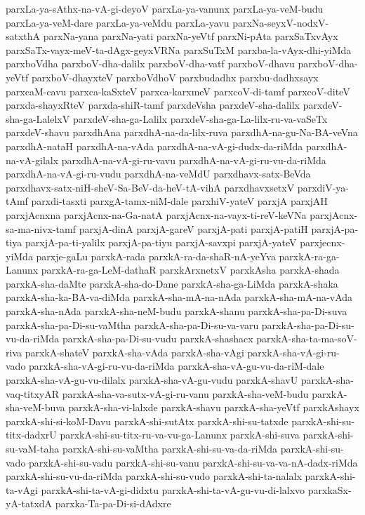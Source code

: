{parxLa-ya-sAthx-na-vA-gi-deyoV
parxLa-ya-vanunx
parxLa-ya-veM-budu
parxLa-ya-veM-dare
parxLa-ya-veMdu
parxLa-yavu
parxNa-seyxV-nodxV-satxthA
parxNa-yana
parxNa-yati
parxNa-yeVtf
parxNi-pAta
parxSaTxvAyx
parxSaTx-vayx-meV-ta-dAgx-geyxVRNa
parxSuTxM
parxba-la-vAyx-dhi-yiMda
parxboVdha
parxboV-dha-dalilx
parxboV-dha-vatf
parxboV-dhavu
parxboV-dha-yeVtf
parxboV-dhayxteV
parxboVdhoV
parxbudadhx
parxbu-dadhxsayx
parxcaM-cavu
parxca-kaSxteV
parxca-karxmeV
parxcoV-di-tamf
parxcoV-diteV
parxda-shayxRteV
parxda-shiR-tamf
parxdeVsha
parxdeV-sha-dalilx
parxdeV-sha-ga-LalelxV
parxdeV-sha-ga-Lalilx
parxdeV-sha-ga-La-lilx-ru-va-vaSeTx
parxdeV-shavu
parxdhAna
parxdhA-na-da-lilx-ruva
parxdhA-na-gu-Na-BA-veVna
parxdhA-nataH
parxdhA-na-vAda
parxdhA-na-vA-gi-dudx-da-riMda
parxdhA-na-vA-gilalx
parxdhA-na-vA-gi-ru-vavu
parxdhA-na-vA-gi-ru-vu-da-riMda
parxdhA-na-vA-gi-ru-vudu
parxdhA-na-veMdU
parxdhavx-satx-BeVda
parxdhavx-satx-niH-sheV-Sa-BeV-da-heV-tA-vihA
parxdhavxsetxV
parxdiV-ya-tAmf
parxdi-tasxti
parxgA-tamx-niM-dale
parxhiV-yateV
parxjA
parxjAH
parxjAcnxna
parxjAcnx-na-Ga-natA
parxjAcnx-na-vayx-ti-reV-keVNa
parxjAcnx-sa-ma-nivx-tamf
parxjA-dinA
parxjA-gareV
parxjA-pati
parxjA-patiH
parxjA-pa-tiya
parxjA-pa-ti-yalilx
parxjA-pa-tiyu
parxjA-savxpi
parxjA-yateV
parxjecnx-yiMda
parxje-gaLu
parxkA-rada
parxkA-ra-da-shaR-nA-yeYva
parxkA-ra-ga-Lanunx
parxkA-ra-ga-LeM-dathaR
parxkArxnetxV
parxkAsha
parxkA-shada
parxkA-sha-daMte
parxkA-sha-do-Dane
parxkA-sha-ga-LiMda
parxkA-shaka
parxkA-sha-ka-BA-va-diMda
parxkA-sha-mA-na-nAda
parxkA-sha-mA-na-vAda
parxkA-sha-nAda
parxkA-sha-neM-budu
parxkA-shanu
parxkA-sha-pa-Di-suva
parxkA-sha-pa-Di-su-vaMtha
parxkA-sha-pa-Di-su-va-varu
parxkA-sha-pa-Di-su-vu-da-riMda
parxkA-sha-pa-Di-su-vudu
parxkA-shashacx
parxkA-sha-ta-ma-soV-riva
parxkA-shateV
parxkA-sha-vAda
parxkA-sha-vAgi
parxkA-sha-vA-gi-ru-vado
parxkA-sha-vA-gi-ru-vu-da-riMda
parxkA-sha-vA-gu-vu-da-riM-dale
parxkA-sha-vA-gu-vu-dilalx
parxkA-sha-vA-gu-vudu
parxkA-shavU
parxkA-sha-vaq-titxyAR
parxkA-sha-va-sutx-vA-gi-ru-vanu
parxkA-sha-veM-budu
parxkA-sha-veM-buva
parxkA-sha-vi-lalxde
parxkA-shavu
parxkA-sha-yeVtf
parxkAshayx
parxkA-shi-si-koM-Davu
parxkA-shi-sutAtx
parxkA-shi-su-tatxde
parxkA-shi-su-titx-dadxrU
parxkA-shi-su-titx-ru-va-vu-ga-Lanunx
parxkA-shi-suva
parxkA-shi-su-vaM-taha
parxkA-shi-su-vaMtha
parxkA-shi-su-va-da-riMda
parxkA-shi-su-vado
parxkA-shi-su-vadu
parxkA-shi-su-vanu
parxkA-shi-su-va-va-nA-dadx-riMda
parxkA-shi-su-vu-da-riMda
parxkA-shi-su-vudo
parxkA-shi-ta-nalalx
parxkA-shi-ta-vAgi
parxkA-shi-ta-vA-gi-didxtu
parxkA-shi-ta-vA-gu-vu-di-lalxvo
parxkaSx-yA-tatxdA
parxka-Ta-pa-Di-si-dAdxre
}
